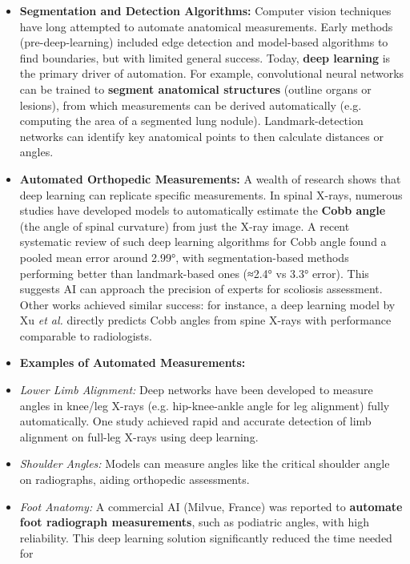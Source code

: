 \documentclass[
]{article}
\begin{document}
\begin{itemize}
\item
  \textbf{Segmentation and Detection Algorithms:} Computer vision
  techniques have long attempted to automate anatomical measurements.
  Early methods (pre-deep-learning) included edge detection and
  model-based algorithms to find boundaries, but with limited general
  success. Today, \textbf{deep learning} is the primary driver of
  automation. For example, convolutional neural networks can be trained
  to \textbf{segment anatomical structures} (outline organs or lesions),
  from which measurements can be derived automatically (e.g. computing
  the area of a segmented lung nodule). Landmark-detection networks can
  identify key anatomical points to then calculate distances or angles.
\item
  \textbf{Automated Orthopedic Measurements:} A wealth of research shows
  that deep learning can replicate specific measurements. In spinal
  X-rays, numerous studies have developed models to automatically
  estimate the \textbf{Cobb angle} (the angle of spinal curvature) from
  just the X-ray
  image\cite{key-26}.
  A recent systematic review of such deep learning algorithms for Cobb
  angle found a pooled mean error around 2.99°, with segmentation-based
  methods performing better than landmark-based ones (≈2.4° vs 3.3°
  error)\cite{key-27}\cite{key-28}.
  This suggests AI can approach the precision of experts for scoliosis
  assessment. Other works achieved similar success: for instance, a deep
  learning model by Xu \emph{et al.} directly predicts Cobb angles from
  spine X-rays with performance comparable to
  radiologists\cite{key-29}.
\item
  \textbf{Examples of Automated Measurements:}
\item
  \emph{Lower Limb Alignment:} Deep networks have been developed to
  measure angles in knee/leg X-rays (e.g. hip-knee-ankle angle for leg
  alignment) fully
  automatically\cite{key-30}.
  One study achieved rapid and accurate detection of limb alignment on
  full-leg X-rays using deep
  learning\cite{key-30}.
\item
  \emph{Shoulder Angles:} Models can measure angles like the critical
  shoulder angle on radiographs, aiding orthopedic
  assessments\cite{key-31}.
\item
  \emph{Foot Anatomy:} A commercial AI (Milvue, France) was reported to
  \textbf{automate foot radiograph measurements}, such as podiatric
  angles, with high
  reliability\cite{key-32}.
  This deep learning solution significantly reduced the time needed for

\end{itemize}
\end{document}
